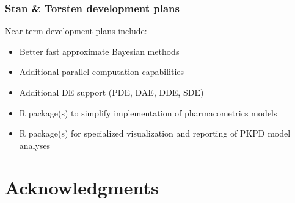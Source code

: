 \documentclass{beamer}
\begin{document}
  \begin{frame}
  \frametitle{Stan \& Torsten development plans}

Near-term development plans include:
  \begin{itemize}
\item<1-> Better fast approximate Bayesian methods
\item<2-> Additional parallel computation capabilities
\item<3-> Additional DE support (PDE, DAE, DDE, SDE)
\item<4-> R package(s) to simplify implementation of pharmacometrics models
\item<4-> R package(s) for specialized visualization and reporting of PKPD model analyses
  \end{itemize}


\end{frame}


\section{Acknowledgments}
\end{document}
